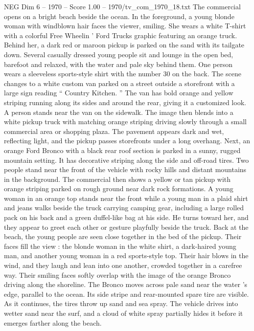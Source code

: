 \begin{textsample}{NEG Dim 6 – 1970 – Score 1.00 – 1970/tv\_com\_1970\_18.txt}  \label{ex:f6_neg_057}
The commercial opens on a bright beach beside the ocean.
In the foreground, a young blonde woman with windblown hair faces the viewer, smiling.
She wears a white T-shirt with a colorful Free Wheelin ’ Ford Trucks graphic featuring an orange truck.
Behind her, a dark red or maroon pickup is parked on the sand with its tailgate down.
Several casually dressed young people sit and lounge in the open bed, barefoot and relaxed, with the water and pale sky behind them.
One person wears a sleeveless sports-style shirt with the number 30 on the back.
The scene changes to a white custom van parked on a street outside a storefront with a large sign reading “ Country Kitchen. ” The van has bold orange and yellow striping running along its sides and around the rear, giving it a customized look.
A person stands near the van on the sidewalk.
The image then blends into a white pickup truck with matching orange striping driving slowly through a small commercial area or shopping plaza.
The pavement appears dark and wet, reflecting light, and the pickup passes storefronts under a long overhang.
Next, an orange Ford Bronco with a black rear roof section is parked in a sunny, rugged mountain setting.
It has decorative striping along the side and off-road tires.
Two people stand near the front of the vehicle with rocky hills and distant mountains in the background.
The commercial then shows a yellow or tan pickup with orange striping parked on rough ground near dark rock formations.
A young woman in an orange top stands near the front while a young man in a plaid shirt and jeans walks beside the truck carrying camping gear, including a large rolled pack on his back and a green duffel-like bag at his side.
He turns toward her, and they appear to greet each other or gesture playfully beside the truck.
Back at the beach, the young people are seen close together in the bed of the pickup.
Their faces fill the view : the blonde woman in the white shirt, a dark-haired young man, and another young woman in a red sports-style top.
Their hair blows in the wind, and they laugh and lean into one another, crowded together in a carefree way.
Their smiling faces softly overlap with the image of the orange Bronco driving along the shoreline.
The Bronco moves across pale sand near the water ’s edge, parallel to the ocean.
Its side stripe and rear-mounted spare tire are visible.
As it continues, the tires throw up sand and sea spray.
The vehicle drives into wetter sand near the surf, and a cloud of white spray partially hides it before it emerges farther along the beach.

\end{textsample}

